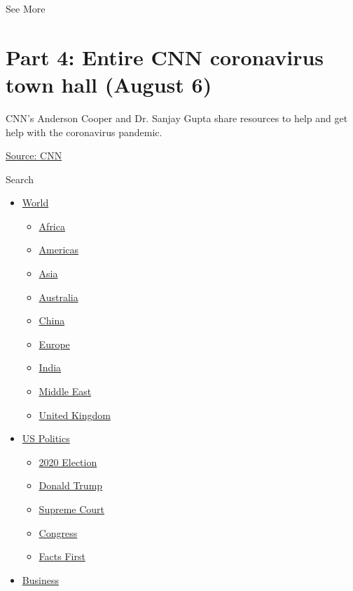 See More

\hypertarget{part-4-entire-cnn-coronavirus-town-hall-august-6-2}{%
\section{Part 4: Entire CNN coronavirus town hall (August
6)}\label{part-4-entire-cnn-coronavirus-town-hall-august-6-2}}

CNN's Anderson Cooper and Dr. Sanjay Gupta share resources to help and
get help with the coronavirus pandemic.

\href{https://www.cnn.com/}{Source: CNN}

Search

\begin{itemize}
\tightlist
\item
  \href{/world}{World}

  \begin{itemize}
  \tightlist
  \item
    \href{/africa}{Africa}
  \item
    \href{/americas}{Americas}
  \item
    \href{/asia}{Asia}
  \item
    \href{/australia}{Australia}
  \item
    \href{/china}{China}
  \item
    \href{/europe}{Europe}
  \item
    \href{/india}{India}
  \item
    \href{/middle-east}{Middle East}
  \item
    \href{/uk}{United Kingdom}
  \end{itemize}
\item
  \href{/politics}{US Politics}

  \begin{itemize}
  \tightlist
  \item
    \href{/election/2020}{2020 Election}
  \item
    \href{/specials/politics/president-donald-trump-45}{Donald Trump}
  \item
    \href{/specials/politics/supreme-court-nine}{Supreme Court}
  \item
    \href{/specials/politics/congress}{Congress}
  \item
    \href{/specials/politics/fact-check-politics}{Facts First}
  \end{itemize}
\item
  \href{/business}{Business}


\end{itemize}
